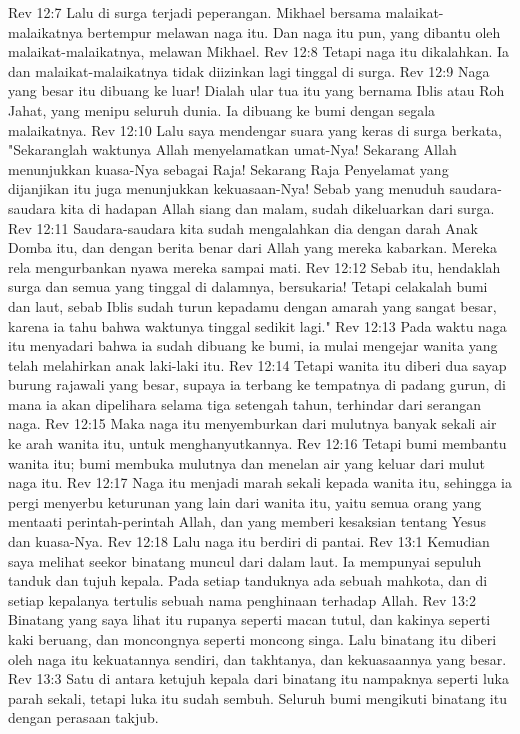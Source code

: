 Rev 12:7  Lalu di surga terjadi peperangan. Mikhael bersama malaikat-malaikatnya bertempur melawan naga itu. Dan naga itu pun, yang dibantu oleh malaikat-malaikatnya, melawan Mikhael.
Rev 12:8  Tetapi naga itu dikalahkan. Ia dan malaikat-malaikatnya tidak diizinkan lagi tinggal di surga.
Rev 12:9  Naga yang besar itu dibuang ke luar! Dialah ular tua itu yang bernama Iblis atau Roh Jahat, yang menipu seluruh dunia. Ia dibuang ke bumi dengan segala malaikatnya.
Rev 12:10  Lalu saya mendengar suara yang keras di surga berkata, "Sekaranglah waktunya Allah menyelamatkan umat-Nya! Sekarang Allah menunjukkan kuasa-Nya sebagai Raja! Sekarang Raja Penyelamat yang dijanjikan itu juga menunjukkan kekuasaan-Nya! Sebab yang menuduh saudara-saudara kita di hadapan Allah siang dan malam, sudah dikeluarkan dari surga.
Rev 12:11  Saudara-saudara kita sudah mengalahkan dia dengan darah Anak Domba itu, dan dengan berita benar dari Allah yang mereka kabarkan. Mereka rela mengurbankan nyawa mereka sampai mati.
Rev 12:12  Sebab itu, hendaklah surga dan semua yang tinggal di dalamnya, bersukaria! Tetapi celakalah bumi dan laut, sebab Iblis sudah turun kepadamu dengan amarah yang sangat besar, karena ia tahu bahwa waktunya tinggal sedikit lagi."
Rev 12:13  Pada waktu naga itu menyadari bahwa ia sudah dibuang ke bumi, ia mulai mengejar wanita yang telah melahirkan anak laki-laki itu.
Rev 12:14  Tetapi wanita itu diberi dua sayap burung rajawali yang besar, supaya ia terbang ke tempatnya di padang gurun, di mana ia akan dipelihara selama tiga setengah tahun, terhindar dari serangan naga.
Rev 12:15  Maka naga itu menyemburkan dari mulutnya banyak sekali air ke arah wanita itu, untuk menghanyutkannya.
Rev 12:16  Tetapi bumi membantu wanita itu; bumi membuka mulutnya dan menelan air yang keluar dari mulut naga itu.
Rev 12:17  Naga itu menjadi marah sekali kepada wanita itu, sehingga ia pergi menyerbu keturunan yang lain dari wanita itu, yaitu semua orang yang mentaati perintah-perintah Allah, dan yang memberi kesaksian tentang Yesus dan kuasa-Nya.
Rev 12:18  Lalu naga itu berdiri di pantai.
Rev 13:1  Kemudian saya melihat seekor binatang muncul dari dalam laut. Ia mempunyai sepuluh tanduk dan tujuh kepala. Pada setiap tanduknya ada sebuah mahkota, dan di setiap kepalanya tertulis sebuah nama penghinaan terhadap Allah.
Rev 13:2  Binatang yang saya lihat itu rupanya seperti macan tutul, dan kakinya seperti kaki beruang, dan moncongnya seperti moncong singa. Lalu binatang itu diberi oleh naga itu kekuatannya sendiri, dan takhtanya, dan kekuasaannya yang besar.
Rev 13:3  Satu di antara ketujuh kepala dari binatang itu nampaknya seperti luka parah sekali, tetapi luka itu sudah sembuh. Seluruh bumi mengikuti binatang itu dengan perasaan takjub.
